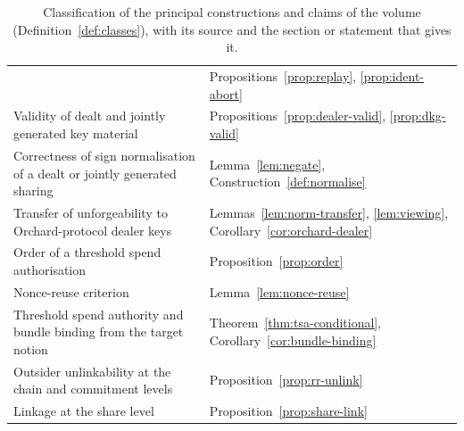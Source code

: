 \documentclass[11pt,a4paper]{article}
\theoremstyle{definition}
\begin{document}
\begin{table}[p]
\begin{tabular}{@{}p{\dimexpr\linewidth-36.5mm-2\tabcolsep\relax}p{36.5mm}@{}}
  & Propositions~\ref{prop:replay}, \ref{prop:ident-abort} \\
\raggedright Validity of dealt and jointly generated key material
  & Propositions~\ref{prop:dealer-valid}, \ref{prop:dkg-valid} \\
\raggedright Correctness of sign normalisation of a dealt or jointly generated
  sharing
  & Lemma~\ref{lem:negate}, Construction~\ref{def:normalise} \\
\raggedright Transfer of unforgeability to Orchard-protocol dealer keys
  & \raggedright Lemmas~\ref{lem:norm-transfer}, \ref{lem:viewing},
    Corollary~\ref{cor:orchard-dealer}\tabularnewline
\raggedright Order of a threshold spend authorisation
  & Proposition~\ref{prop:order} \\
\raggedright Nonce-reuse criterion
  & Lemma~\ref{lem:nonce-reuse} \\
\raggedright Threshold spend authority and bundle binding from the target notion
  & Theorem~\ref{thm:tsa-conditional}, Corollary~\ref{cor:bundle-binding} \\
\raggedright Outsider unlinkability at the chain and commitment levels
  & Proposition~\ref{prop:rr-unlink} \\
\raggedright Linkage at the share level
  & Proposition~\ref{prop:share-link} \\
\bottomrule
\end{tabular}
\caption{Classification of the principal constructions and claims of the volume
(Definition~\ref{def:classes}), with its source and the section or statement
that gives it.}
\label{tab:status}
\end{table}
\end{document}
